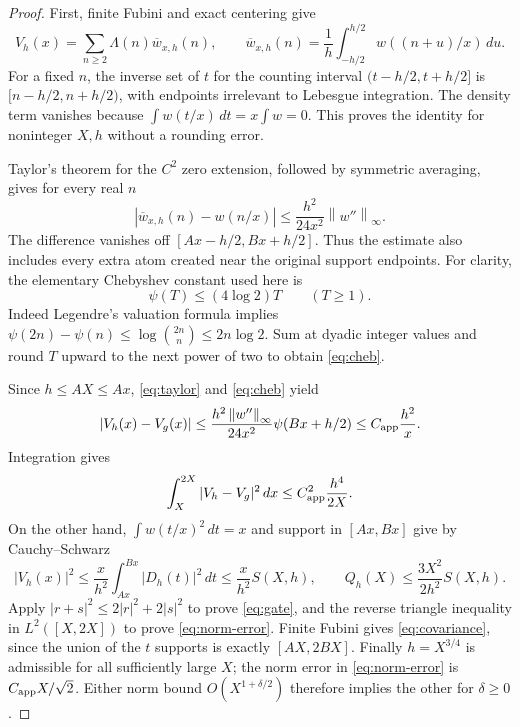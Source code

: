 \documentclass[11pt]{article}
\theoremstyle{remark}
\newcommand{\dd}{\,d}
\newcommand{\norm}[1]{\left\|#1\right\|}
\numberwithin{equation}{section}
\begin{document}
\begin{proof}
First, finite Fubini and exact centering give
\begin{equation}\label{eq:finite-fubini}
V_h(x)=\sum_{n\ge2}\Lambda(n)\overline w_{x,h}(n),\qquad
\overline w_{x,h}(n)=\frac1h\int_{-h/2}^{h/2}w((n+u)/x)\dd u.
\end{equation}
For a fixed $n$, the inverse set of $t$ for the counting interval
$(t-h/2,t+h/2]$ is $[n-h/2,n+h/2)$, with endpoints irrelevant to
Lebesgue integration. The density term vanishes because
$\int w(t/x)\dd t=x\int w=0$. This proves the identity for
noninteger $X,h$ without a rounding error.

Taylor's theorem for the $C^2$ zero extension, followed by symmetric
averaging, gives for every real $n$
\begin{equation}\label{eq:taylor}
|\overline w_{x,h}(n)-w(n/x)|
\le \frac{h^2}{24x^2}\norm{w''}_\infty.
\end{equation}
The difference vanishes off $[Ax-h/2,Bx+h/2]$. Thus the estimate also
includes every extra atom created near the original support endpoints.
For clarity, the elementary Chebyshev constant used here is
\begin{equation}\label{eq:cheb}
\psi(T)\le(4\log2)T\qquad(T\ge1).
\end{equation}
Indeed Legendre's valuation formula implies
$\psi(2n)-\psi(n)\le\log\binom{2n}{n}\le2n\log2$.
Sum at dyadic integer values and round $T$ upward to the next power
of two to obtain \eqref{eq:cheb}.

Since $h\le AX\le Ax$, \eqref{eq:taylor} and \eqref{eq:cheb} yield
\[
|V_h(x)-V_g(x)|\le\frac{h^2\norm{w''}_\infty}{24x^2}
\psi(Bx+h/2)\le C_{\rm app}\frac{h^2}{x}.
\]
Integration gives
\begin{equation}\label{eq:L2-error}
\int_X^{2X}|V_h-V_g|^2\dd x\le C_{\rm app}^2\frac{h^4}{2X}.
\end{equation}
On the other hand, $\int w(t/x)^2\dd t=x$ and support in $[Ax,Bx]$
give by Cauchy--Schwarz
\[
|V_h(x)|^2\le\frac{x}{h^2}\int_{Ax}^{Bx}|D_h(t)|^2\dd t
\le\frac{x}{h^2}S(X,h),\qquad
Q_h(X)\le\frac{3X^2}{2h^2}S(X,h).
\]
Apply $|r+s|^2\le2|r|^2+2|s|^2$ to prove \eqref{eq:gate}, and
the reverse triangle inequality in $L^2([X,2X])$ to prove
\eqref{eq:norm-error}. Finite Fubini gives \eqref{eq:covariance},
since the union of the $t$ supports is exactly $[AX,2BX]$.
Finally $h=X^{3/4}$ is admissible for all sufficiently large $X$;
the norm error in \eqref{eq:norm-error} is $C_{\rm app}X/\sqrt2$.
Either norm bound $O(X^{1+\delta/2})$ therefore implies the other
for $\delta\ge0$.
\end{proof}
\end{document}
